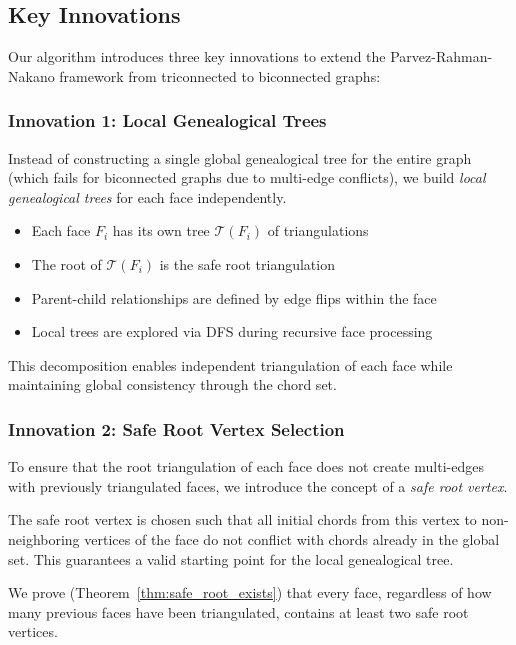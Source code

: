 \documentclass[12pt,a4paper]{article}
\theoremstyle{definition}
\theoremstyle{remark}
\begin{document}
\subsection{Key Innovations}

Our algorithm introduces three key innovations to extend the Parvez-Rahman-Nakano framework from triconnected to biconnected graphs:

\subsubsection{Innovation 1: Local Genealogical Trees}

Instead of constructing a single global genealogical tree for the entire graph (which fails for biconnected graphs due to multi-edge conflicts), we build \emph{local genealogical trees} for each face independently.

\begin{itemize}
    \item Each face $F_i$ has its own tree $\mathcal{T}(F_i)$ of triangulations
    \item The root of $\mathcal{T}(F_i)$ is the safe root triangulation
    \item Parent-child relationships are defined by edge flips within the face
    \item Local trees are explored via DFS during recursive face processing
\end{itemize}

This decomposition enables independent triangulation of each face while maintaining global consistency through the chord set.

\subsubsection{Innovation 2: Safe Root Vertex Selection}

To ensure that the root triangulation of each face does not create multi-edges with previously triangulated faces, we introduce the concept of a \emph{safe root vertex}.

The safe root vertex is chosen such that all initial chords from this vertex to non-neighboring vertices of the face do not conflict with chords already in the global set. This guarantees a valid starting point for the local genealogical tree.

We prove (Theorem~\ref{thm:safe_root_exists}) that every face, regardless of how many previous faces have been triangulated, contains at least two safe root vertices.
\end{document}
